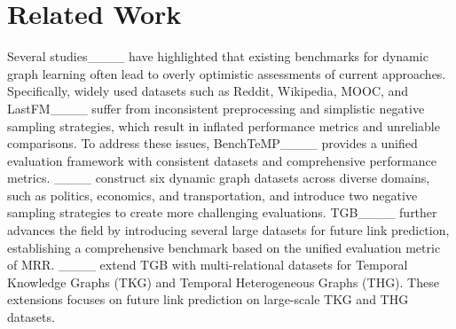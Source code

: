 \section{Related Work}
Several studies____ have highlighted that existing benchmarks for dynamic graph learning often lead to overly optimistic assessments of current approaches. Specifically, widely used datasets such as Reddit, Wikipedia, MOOC, and LastFM____ suffer from inconsistent preprocessing and simplistic negative sampling strategies, which result in inflated performance metrics and unreliable comparisons. To address these issues, BenchTeMP____ provides a unified evaluation framework with consistent datasets and comprehensive performance metrics. ____ construct six dynamic graph datasets across diverse domains, such as politics, economics, and transportation, and introduce two negative sampling strategies to create more challenging evaluations. 
TGB____ further advances the field by introducing several large datasets for future link prediction, establishing a comprehensive benchmark based on the unified evaluation metric of MRR.
____ extend TGB with multi-relational datasets for Temporal Knowledge Graphs (TKG) and Temporal Heterogeneous Graphs (THG). These extensions focuses on future link prediction on large-scale TKG and THG datasets.

